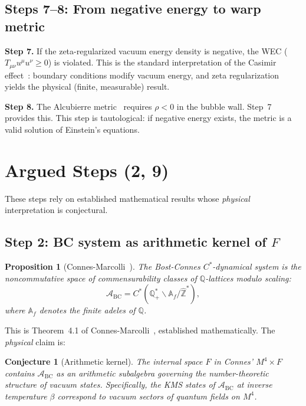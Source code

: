 \documentclass[aps,prd,twocolumn,superscriptaddress,nofootinbib]{revtex4-2}
\newtheorem{proposition}[theorem]{Proposition}
\newtheorem{conjecture}[theorem]{Conjecture}
\newcommand{\Zhat}{\hat{\mathbb{Z}}}
\begin{document}
\subsection{Steps 7--8: From negative energy to warp metric}

\textbf{Step 7.} If the zeta-regularized vacuum energy density is
negative, the WEC ($T_{\mu\nu} u^\mu u^\nu \geq 0$) is violated.
This is the standard interpretation of the Casimir
effect~\cite{Casimir1948,Bordag2009}: boundary conditions modify
vacuum energy, and zeta regularization yields the physical
(finite, measurable) result.

\textbf{Step 8.} The Alcubierre metric~\cite{Alcubierre1994} requires
$\rho < 0$ in the bubble wall. Step~7 provides this.
This step is tautological: if negative energy exists, the metric
is a valid solution of Einstein's equations.

\section{Argued Steps (2, 9)}
\label{sec:argued}

These steps rely on established mathematical results whose
\emph{physical} interpretation is conjectural.

\subsection{Step 2: BC system as arithmetic kernel of $F$}

\begin{proposition}[Connes-Marcolli~\cite{ConnesMarcolli2006}]
The Bost-Connes $C^*$-dynamical system is the noncommutative
space of commensurability classes of $\mathbb{Q}$-lattices
modulo scaling:
\begin{equation}
  \mathcal{A}_{\mathrm{BC}} = C^*(\mathbb{Q}_+^* \backslash \mathbb{A}_f / \Zhat^*),
  \label{eq:bc_algebra}
\end{equation}
where $\mathbb{A}_f$ denotes the finite adeles of $\mathbb{Q}$.
\end{proposition}

This is Theorem~4.1 of Connes-Marcolli~\cite{ConnesMarcolli2006},
established mathematically. The \emph{physical} claim is:

\begin{conjecture}[Arithmetic kernel]
\label{conj:kernel}
The internal space $F$ in Connes' $M^4 \times F$ contains
$\mathcal{A}_{\mathrm{BC}}$ as an arithmetic subalgebra
governing the number-theoretic structure of vacuum states.
Specifically, the KMS states of $\mathcal{A}_{\mathrm{BC}}$
at inverse temperature $\beta$ correspond to vacuum sectors
of quantum fields on $M^4$.
\end{conjecture}
\end{document}
